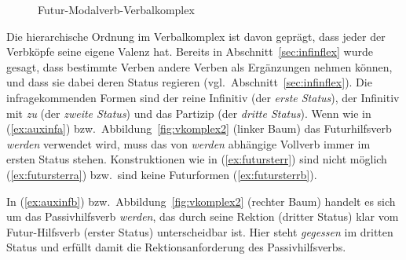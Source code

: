 \begin{figure}
  \centering
  \vspace{0.3cm}
  \caption{Futur-Modalverb-Verbalkomplex}
  \label{fig:vkomplex3}
\end{figure}


Die hierarchische Ordnung im Verbalkomplex ist davon geprägt, dass jeder der Verbköpfe seine eigene Valenz hat.
Bereits in Abschnitt~\ref{sec:infinflex} wurde gesagt, dass bestimmte Verben andere Verben als Ergänzungen nehmen können, und dass sie dabei deren Status regieren (vgl.\ Abschnitt~\ref{sec:infinflex}).
Die infragekommenden Formen sind der reine Infinitiv (der \textit{erste Status}), der Infinitiv mit \textit{zu} (der \textit{zweite Status}) und das Partizip (der \textit{dritte Status}).
Wenn wie in (\ref{ex:auxinfa}) bzw.\ Abbildung~\ref{fig:vkomplex2} (linker Baum) das Futurhilfsverb \textit{werden} verwendet wird, muss das von \textit{werden} abhängige Vollverb immer im ersten Status stehen.
Konstruktionen wie in (\ref{ex:futursterr}) sind nicht möglich (\ref{ex:futursterra}) bzw.\ sind keine Futurformen (\ref{ex:futursterrb}).

\begin{exe}
  \ex\label{ex:futursterr}
  \begin{xlist}
  \end{xlist}
\end{exe}

In (\ref{ex:auxinfb}) bzw.\ Abbildung~\ref{fig:vkomplex2} (rechter Baum) handelt es sich um das Passivhilfsverb \textit{werden}, das durch seine Rektion (dritter Status) klar vom Futur-Hilfsverb (erster Status) unterscheidbar ist.
Hier steht \textit{gegessen} im dritten Status und erfüllt damit die Rektionsanforderung des Passivhilfsverbs.

